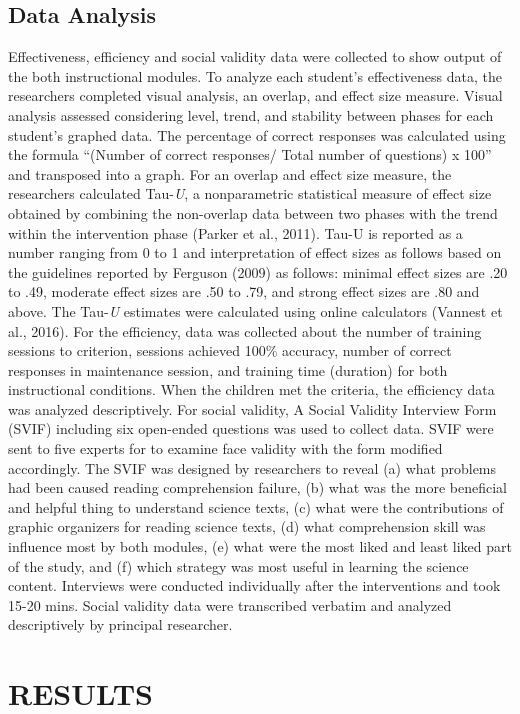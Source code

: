 \documentclass[11.5pt]{sig-alternate} %
\begin{document}
\begin{large}
\subsection*{Data Analysis}
Effectiveness, efficiency and social validity data were collected to show output of the both instructional modules. To analyze each student’s effectiveness data, the researchers completed visual analysis, an overlap, and effect size measure. Visual analysis assessed considering level, trend, and stability between phases for each student’s graphed data. The percentage of correct responses was calculated using the formula “(Number of correct responses/ Total number of questions) x 100” and transposed into a graph. For an overlap and effect size measure, the researchers calculated Tau-\textit{U}, a nonparametric statistical measure of effect size obtained by combining the non-overlap data between two phases with the trend within the intervention phase (Parker et al., 2011). Tau-\textit{}U is reported as a number ranging from 0 to 1 and interpretation of effect sizes as follows based on the guidelines reported by Ferguson (2009) as follows: minimal effect sizes are .20 to .49, moderate effect sizes are .50 to .79, and strong effect sizes are .80 and above. The Tau-\textit{U} estimates were calculated using online calculators (Vannest et al., 2016). For the efficiency, data was collected about the number of training sessions to criterion, sessions achieved 100\% accuracy, number of correct responses in maintenance session, and training time (duration) for both instructional conditions. When the children met the criteria, the efficiency data was analyzed descriptively. For social validity, A Social Validity Interview Form (SVIF) including six open-ended questions was used to collect data. SVIF were sent to five experts for to examine face validity with the form modified accordingly. The SVIF was designed by researchers to reveal (a) what problems had been caused reading comprehension failure, (b) what was the more beneficial and helpful thing to understand science texts, (c) what were the contributions of graphic organizers for reading science texts, (d) what comprehension skill was influence most by both modules, (e) what were the most liked and least liked part of the study, and (f) which strategy was most useful in learning the science content. Interviews were conducted individually after the interventions and took 15-20 mins. Social validity data were transcribed verbatim and analyzed descriptively by principal researcher.

\section*{RESULTS}

\end{large}
\end{document}
